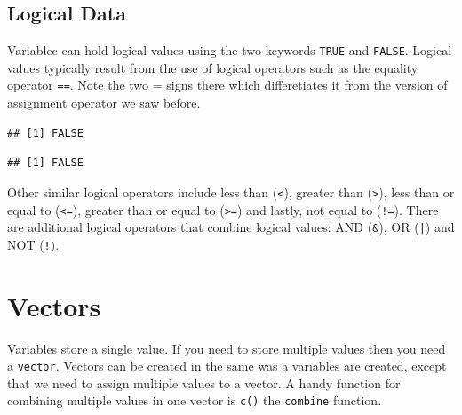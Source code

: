\documentclass[11pt, letterpaper, twoside]{memoir}\usepackage{knitr}
\begin{document}
\subsection{Logical Data}

Variablec can hold logical values using the two keywords \texttt{TRUE} and \texttt{FALSE}.  Logical values typically result from the use of logical operators such as the equality operator \texttt{==}. Note the two = signs there which differetiates it from the version of assignment operator we saw before.

\begin{knitrout}
\color{fgcolor}\begin{kframe}
\begin{alltt}
 \hlopt{==}  
\end{alltt}
\begin{verbatim}
## [1] FALSE
\end{verbatim}
\begin{alltt}
 \hlopt{==}  
\end{alltt}
\begin{verbatim}
## [1] FALSE
\end{verbatim}
\end{kframe}
\end{knitrout}

Other similar logical operators include less than (\texttt{<}), greater than (\texttt{>}), less than or equal to (\texttt{<=}), greater than or equal to (\texttt{>=}) and lastly, not equal to (\texttt{!=}). There are additional logical operators that combine logical values: AND (\verb|&|), OR (\texttt{|}) and NOT (\texttt{!}).


\section{Vectors}

Variables store a single value. If you need to store multiple values then you need a \texttt{vector}. Vectors can be created in the same was a variables are created, except that we need to assign multiple values to a vector. A handy function for combining multiple values in one vector is \texttt{c()} the \texttt{combine} function. 

\begin{knitrout}
\color{fgcolor}\begin{kframe}
\begin{alltt}
 \hlkwb{<-} \hlstd{(}\hlstd{,} \hlstd{,} \hlstd{,} \hlstd{,} \hlstd{,} \hlstd{,} \hlstd{)}
\end{alltt}
\end{kframe}
\end{knitrout}
\end{document}
